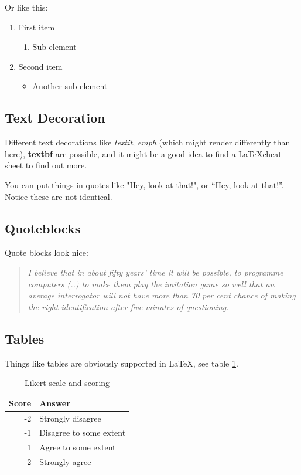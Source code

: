 \documentclass[a4paper, twocolumn]{article}
\begin{document}
Or like this:

\begin{enumerate}
    \item First item
        \begin{enumerate}
            \item Sub element
        \end{enumerate}
    \item Second item
        \begin{itemize}
            \item Another sub element
        \end{itemize}
\end{enumerate}


\subsection{Text Decoration\label{sec:Text Decoration}}


Different text decorations like \textit{textit}, \emph{emph} (which might render differently than here), \textbf{textbf} are possible, and it might be a good idea to find a \LaTeX cheat-sheet to find out more.

You can put things in quotes like "Hey, look at that!", or ``Hey, look at that!''.
Notice these are not identical.


\subsection{Quoteblocks\label{sec:Quoteblock}}

Quote blocks look nice:

\begin{quote}
\emph{
I believe that in about fifty years' time it will be possible, to programme computers (..) to make them play the imitation game so well that an average interrogator will not have more than 70 per cent chance of making the right identification after five minutes of questioning.
}
\cite{turing1950computing}
\end{quote}


\subsection{Tables\label{sec:Tables}}

Things like tables are obviously supported in \LaTeX, see table \ref{table:Likert scale and scoring}.

\begin{table}[ht]
    \caption{Likert scale and scoring}
    \centering
    \begin{tabular}{r | l}
        \hline\hline
        Score & Answer \\ [0.5ex] %
        \hline
        -2 & Strongly disagree \\
        -1 & Disagree to some extent \\
        1 & Agree to some extent \\
        2 & Strongly agree \\ [1ex]
        \hline
    \end{tabular}
    \label{table:Likert scale and scoring}
\end{table}
\end{document}

